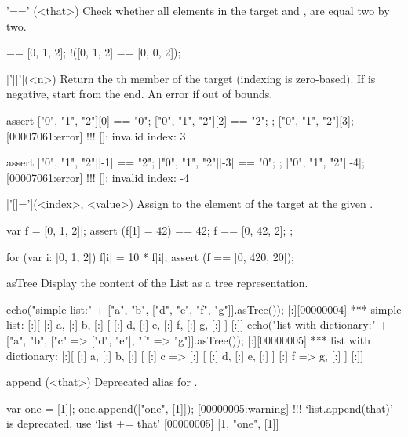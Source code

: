 \begin{urbiscriptapi}
\item['=='](<that>)%
Check whether all elements in the target and , are
equal two by two.

\begin{urbiassert}
[0, 1, 2] == [0, 1, 2];
!([0, 1, 2] == [0, 0, 2]);
\end{urbiassert}


\item|'[]'|(<n>)%
  Return the th member of the target (indexing is
  zero-based). If  is negative, start from the end.  An error
  if out of bounds.

\begin{urbiscript}
assert
{
  ["0", "1", "2"][0] == "0";
  ["0", "1", "2"][2] == "2";
};
["0", "1", "2"][3];
[00007061:error] !!! []: invalid index: 3

assert
{
  ["0", "1", "2"][-1] == "2";
  ["0", "1", "2"][-3] == "0";
};
["0", "1", "2"][-4];
[00007061:error] !!! []: invalid index: -4
\end{urbiscript}


\item|'[]='|(<index>, <value>)%
  Assign  to the element of the target at the given
  .

\begin{urbiscript}
var f = [0, 1, 2]|;
assert
{
  (f[1] = 42) == 42;
  f == [0, 42, 2];
};

for (var i: [0, 1, 2])
  f[i] = 10 * f[i];
assert (f == [0, 420, 20]);
\end{urbiscript}

\item[asTree]%
Display the content of the List as a tree representation.
\begin{urbiscript}
echo("simple list:" + ["a", "b", ["d", "e", "f", "g"]].asTree());
[:][00000004] *** simple list:
[:][
[:]  a,
[:]  b,
[:]  [
[:]    d,
[:]    e,
[:]    f,
[:]    g,
[:]  ]
[:]]
echo("list with dictionary:" +
  ["a", "b", ["c" => ["d", "e"], "f" => "g"]].asTree());
[:][00000005] *** list with dictionary:
[:][
[:]  a,
[:]  b,
[:]  [
[:]    c =>
[:]    [
[:]      d,
[:]      e,
[:]    ]
[:]    f => g,
[:]  ]
[:]]
\end{urbiscript}

\item[append](<that>)%
  Deprecated alias for .

\begin{urbiscript}
var one = [1]|;
one.append(["one", [1]]);
[00000005:warning] !!! `list.append(that)' is deprecated, use `list += that'
[00000005] [1, "one", [1]]
\end{urbiscript}



\end{urbiscriptapi}
